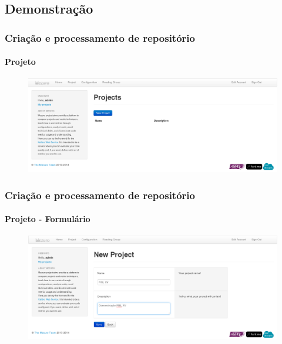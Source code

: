 \documentclass{beamer}
\begin{document}
  \subsection{Demonstração}
  \begin{frame}
    \frametitle{Criação e processamento de repositório}
    \framesubtitle{Projeto}

    \begin{figure}[htb]
      \begin{center}
        \includegraphics[scale=0.24]{images/00-new-project.png}
      \end{center}
    \end{figure}
  \end{frame}

  \begin{frame}
    \frametitle{Criação e processamento de repositório}
    \framesubtitle{Projeto - Formulário}

    \begin{figure}[htb]
      \begin{center}
        \includegraphics[scale=0.24]{images/01-new-project-form.png}
      \end{center}
    \end{figure}
  \end{frame}
\end{document}
